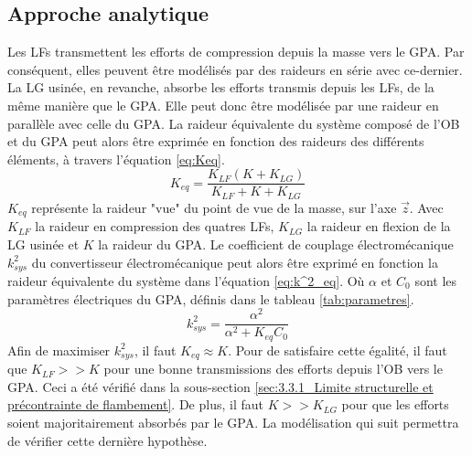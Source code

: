 	\subsection{Approche analytique}
	\label{subsec:3.2.1:Approche analytique LG}
Les LFs transmettent les efforts de compression depuis la masse vers le GPA. Par conséquent, elles peuvent être modélisés par des raideurs en série avec ce-dernier. La LG usinée, en revanche, absorbe les efforts transmis depuis les LFs, de la même manière que le GPA. Elle peut donc être modélisée par une raideur en parallèle avec celle du GPA. La raideur équivalente du système composé de l'OB et du GPA peut alors être exprimée en fonction des raideurs des différents éléments, à travers l'équation \ref{eq:Keq}.
\begin{equation}
	K_{eq} = \dfrac{K_{LF}(K + K_{LG})}{K_{LF}+ K + K_{LG}}
	\label{eq:Keq}
\end{equation}
$K_{eq}$ représente la raideur "vue" du point de vue de la masse, sur l'axe $\vec{z}$. Avec $K_{LF}$ la raideur en compression des quatres LFs, $K_{LG}$ la raideur en flexion de la LG usinée et $K$ la raideur du GPA. Le coefficient de couplage électromécanique $k^2_{sys}$ du convertisseur électromécanique peut alors être exprimé en fonction la raideur équivalente du système dans l'équation \ref{eq:k^2_eq}. Où $\alpha$ et $C_0$ sont les paramètres électriques du GPA, définis dans le tableau \ref{tab:parametres}.
\begin{equation}
	k^2_{sys} = \dfrac{\alpha^2 }{\alpha^2 + K_{eq}C_0}
	\label{eq:k^2_eq}
\end{equation}
Afin de maximiser $k^2_{sys}$, il faut $K_{eq}\approx K$. Pour de satisfaire cette égalité, il faut que $K_{LF}>>K$ pour une bonne transmissions des efforts depuis l'OB vers le GPA. Ceci a été vérifié dans la sous-section \ref{sec:3.3.1_Limite structurelle et précontrainte de flambement}. De plus, il faut $K>>K_{LG}$ pour que les efforts soient majoritairement absorbés par le GPA. La modélisation qui suit permettra de vérifier cette dernière hypothèse.
 
